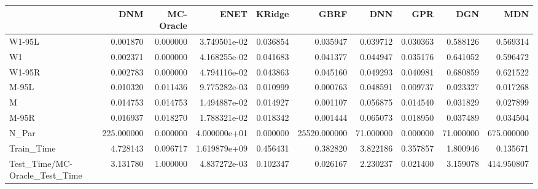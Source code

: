 \begin{tabular}{lrrrrrrrrr}
\toprule
{} &         DNM &  MC-Oracle &          ENET &    KRidge &          GBRF &        DNN &       GPR &        DGN &         MDN \\
\midrule
W1-95L                        &    0.001870 &   0.000000 &  3.749501e-02 &  0.036854 &      0.035947 &   0.039712 &  0.030363 &   0.588126 &    0.569314 \\
W1                            &    0.002371 &   0.000000 &  4.168255e-02 &  0.041683 &      0.041377 &   0.044947 &  0.035176 &   0.641052 &    0.596472 \\
W1-95R                        &    0.002783 &   0.000000 &  4.794116e-02 &  0.043863 &      0.045160 &   0.049293 &  0.040981 &   0.680859 &    0.621522 \\
M-95L                         &    0.010320 &   0.011436 &  9.775282e-03 &  0.010999 &      0.000763 &   0.048591 &  0.009737 &   0.023327 &    0.017268 \\
M                             &    0.014753 &   0.014753 &  1.494887e-02 &  0.014927 &      0.001107 &   0.056875 &  0.014540 &   0.031829 &    0.027899 \\
M-95R                         &    0.016937 &   0.018270 &  1.788321e-02 &  0.018342 &      0.001444 &   0.065073 &  0.018950 &   0.037489 &    0.034504 \\
N\_Par                         &  225.000000 &   0.000000 &  4.000000e+01 &  0.000000 &  25520.000000 &  71.000000 &  0.000000 &  71.000000 &  675.000000 \\
Train\_Time                    &    4.728143 &   0.096717 &  1.619879e+09 &  0.456431 &      0.382820 &   3.822186 &  0.357857 &   1.800946 &    0.135671 \\
Test\_Time/MC-Oracle\_Test\_Time &    3.131780 &   1.000000 &  4.837272e-03 &  0.102347 &      0.026167 &   2.230237 &  0.021400 &   3.159078 &  414.950807 \\
\bottomrule
\end{tabular}
